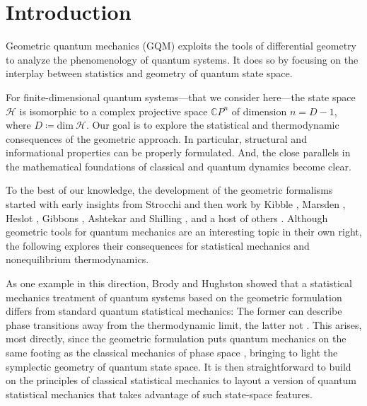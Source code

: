 \documentclass[draft,nofootinbib,pre,twocolumn,showpacs,showkeys,groupaddress,preprintnumbers,floatfix]{revtex4-1}
\newcommand{\1}{\mathbbm{1}}
\begin{document}

\date{\today}
\maketitle





\section{Introduction}
\label{sec:Intro}

Geometric quantum mechanics (GQM) exploits the tools of differential geometry
to analyze the phenomenology of quantum systems. It does so by focusing on the
interplay between statistics and geometry of quantum state space.

For finite-dimensional quantum systems---that we consider here---the state
space $\mathcal{H}$ is isomorphic to a complex projective space $\mathbb{C}P^n$
of dimension $n=D-1$, where $D\coloneqq \mathrm{dim}~\mathcal{H}$. Our goal is
to explore the statistical and thermodynamic consequences of the geometric
approach. In particular, structural and informational properties can be
properly formulated. And, the close parallels in the mathematical foundations
of classical and quantum dynamics become clear.

To the best of our knowledge, the development of the geometric formalisms
started with early insights from Strocchi \cite{STROCCHI1966} and then work by
Kibble \cite{Kibble1979}, Marsden \cite{Chern76a}, Heslot \cite{Heslot1985},
Gibbons \cite{Gibbons1992}, Ashtekar and Shilling
\cite{Ashtekar1995,Ashtekar1999}, and a host of others
\cite{Hugh95,Brody2001,Bengtsson2017,Carinena2007,Chruscinski2006,Marmo2010,Avron2020,Pastorello2015,Pastorello2015a,Pastorello2016,Clemente-Gallardo2013}.
Although geometric tools for quantum mechanics are an interesting topic in
their own right, the following explores their consequences for statistical
mechanics and nonequilibrium thermodynamics.

As one example in this direction, Brody and Hughston
\cite{Brody1998,Brody2007,Brody2016} showed that a statistical mechanics
treatment of quantum systems based on the geometric formulation differs from
standard quantum statistical mechanics: The former can describe phase
transitions away from the thermodynamic limit, the latter not
\cite{Brody2007b}. This arises, most directly, since the geometric formulation
puts quantum mechanics on the same footing as the classical mechanics of phase
space \cite{Heslot1985,STROCCHI1966}, bringing to light the symplectic geometry
of quantum state space. It is then straightforward to build on the principles
of classical statistical mechanics to layout a version of quantum statistical
mechanics that takes advantage of such state-space features.
\end{document}
